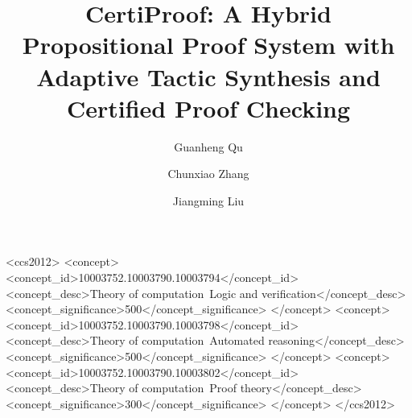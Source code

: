 \documentclass[acmtocl,review,anonymous]{acmart}
\begin{document}
\title{CertiProof: A Hybrid Propositional Proof System with Adaptive Tactic Synthesis and Certified Proof Checking}

\author{Guanheng Qu}

\author{Chunxiao Zhang}

\author{Jiangming Liu}

\begin{CCSXML}
<ccs2012>
   <concept>
       <concept_id>10003752.10003790.10003794</concept_id>
       <concept_desc>Theory of computation~Logic and verification</concept_desc>
       <concept_significance>500</concept_significance>
   </concept>
   <concept>
       <concept_id>10003752.10003790.10003798</concept_id>
       <concept_desc>Theory of computation~Automated reasoning</concept_desc>
       <concept_significance>500</concept_significance>
   </concept>
   <concept>
       <concept_id>10003752.10003790.10003802</concept_id>
       <concept_desc>Theory of computation~Proof theory</concept_desc>
       <concept_significance>300</concept_significance>
   </concept>
</ccs2012>
\end{CCSXML}

\end{document}
